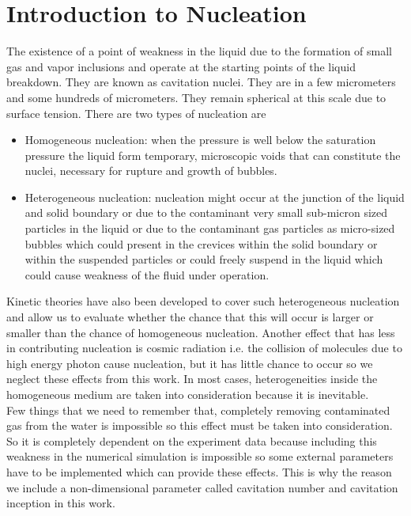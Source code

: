 \section{Introduction to Nucleation}
The existence of a point of weakness in the liquid due to the formation of small gas and vapor inclusions and operate at the starting points of the liquid breakdown. They are known as cavitation nuclei. They are 
in a few micrometers and some hundreds of micrometers. They remain spherical at this scale due to surface tension. There are two types of nucleation  are
\begin{itemize}
\item Homogeneous nucleation: when the pressure is well below the saturation pressure the liquid form temporary, microscopic voids that can constitute the nuclei, necessary for rupture and growth of bubbles.
\item Heterogeneous nucleation:  nucleation might occur at the junction of the liquid and solid boundary or due to the contaminant very small sub-micron sized particles in the liquid or due to the
contaminant gas particles as micro-sized bubbles which could present in the crevices within the solid boundary or within the suspended particles or could freely suspend in the liquid which could cause 
 weakness of the fluid under operation.
 \end{itemize}
 Kinetic theories have also been developed to cover such heterogeneous nucleation and allow us to evaluate whether the chance that this will occur is larger or smaller than the chance of homogeneous nucleation.
 Another effect that has less in contributing nucleation is cosmic radiation i.e. the collision of molecules due to high energy photon cause nucleation, but it has little chance to occur so we neglect these
 effects from this work. In most cases, heterogeneities inside the homogeneous medium are taken into consideration because it is inevitable.\\
 Few things that we need to remember that, completely removing contaminated gas from the water is impossible so this effect must be taken into consideration. So it is completely dependent on the
 experiment data because including this weakness in the numerical simulation is impossible so some external parameters have to be implemented which can provide these effects. This is why the reason we include a non-dimensional parameter called cavitation number and cavitation inception
 in this work.\\
